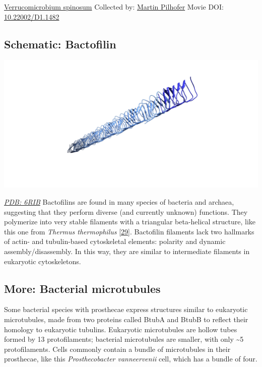 \documentclass[]{tufte-book}
\begin{document}
\hypertarget{htmlwidget-ce61c246edd4547a7d1c}{}

\label{fig:3-6}\protect\hyperlink{tree}{Verrucomicrobium spinosum} Collected by: \protect\hyperlink{martin_pilhofer}{Martin Pilhofer} Movie DOI: \href{https://doi.org/10.22002/D1.1482}{10.22002/D1.1482}

\hypertarget{Bactofilin}{%
\subsection*{Schematic: Bactofilin}\label{Bactofilin}}

\includegraphics{img/schematics/3_6_1}

\href{http://rcsb.org/structure/6RIB}{\emph{PDB: 6RIB}}
Bactofilins are found in many species of bacteria and archaea, suggesting that they perform diverse (and currently unknown) functions. They polymerize into very stable filaments with a triangular beta-helical structure, like this one from \emph{Thermus thermophilus} {[}\protect\hyperlink{ref-deng2019}{29}{]}. Bactofilin filaments lack two hallmarks of actin- and tubulin-based cytoskeletal elements: polarity and dynamic assembly/disassembly. In this way, they are similar to intermediate filaments in eukaryotic cytoskeletons.

\hypertarget{Bacterial_microtubules}{%
\subsection*{More: Bacterial microtubules}\label{Bacterial_microtubules}}

Some bacterial species with prosthecae express structures similar to eukaryotic microtubules, made from two proteins called BtubA and BtubB to reflect their homology to eukaryotic tubulins. Eukaryotic microtubules are hollow tubes formed by 13 protofilaments; bacterial microtubules are smaller, with only \textasciitilde{}5 protofilaments. Cells commonly contain a bundle of microtubules in their prosthecae, like this \emph{Prosthecobacter vanneervenii} cell, which has a bundle of four.
\end{document}
